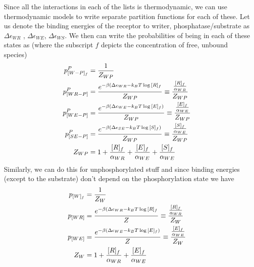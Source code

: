 \documentclass[preprint,onecolumn,amsmath]{revtex4-1}
\begin{document}
Since all the interactions in each of the lists is thermodynamic, we can use thermodynamic models to write separate partition functions for each of these. Let
us denote the binding energies of the receptor to writer, phosphatase/substrate as $\Delta \epsilon_{WR}$ , $\Delta \epsilon_{WE}$, $\Delta \epsilon_{WS}$.
We then can write the probabilities of being in each of these states as (where the subscript $f$ depicts the concentration of free, unbound species)
\begin{align}
p_{[W-P]_f}^P &= {1 \over Z_{WP}} \\
p_{[WR-P]}^P &= {e^{-\beta (\Delta \epsilon_{WR} -k_B T \log{[R]_f}}  \over Z_{WP}}  \equiv { {[R]_f \over \alpha_{WR}} \over Z_{WP}} \\
p_{[WE-P]}^P &= {e^{-\beta (\Delta \epsilon_{WE} -k_B T \log{[E]_f})}  \over Z_{WP}}  \equiv { {[E]_f \over \alpha_{WE}} \over Z_{WP}} \\
p_{[SE-P]}^P &= {e^{-\beta (\Delta \epsilon_{SE} -k_B T \log{[S]_f})}  \over Z_{WP}}  \equiv { {[S]_f \over \alpha_{WE}} \over Z_{WP}} \\
Z_{WP} &= 1+ {[R]_f \over \alpha_{WR}}+{[E]_f \over \alpha_{WE}}+{[S]_f \over \alpha_{WE}}
\end{align}
Similarly, we can do this for unphosphorylated stuff and since binding energies (except to the substrate) don't depend on the phosphorylation state
we have
\begin{align}
p_{[W]_f} &= {1 \over Z_W} \\
p_{[WR]} &= {e^{-\beta (\Delta \epsilon_{WR} -k_B T \log{[R]_f}}  \over Z}  \equiv { {[R]_f \over \alpha_{WR}} \over Z_W} \\
p_{[WE]} &= {e^{-\beta (\Delta \epsilon_{WE} -k_B T \log{[E]_f})}  \over Z}  \equiv { {[E]_f \over \alpha_{WE}} \over Z_W} \\
Z_W &=1+ {[R]_f \over \alpha_{WR}}+{[E]_f \over \alpha_{WE}}
\end{align}
\end{document}
